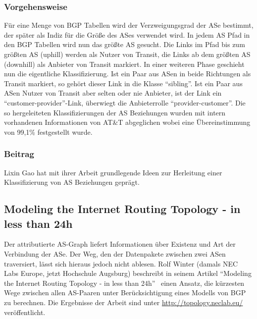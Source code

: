 \subsubsection{Vorgehensweise}
Für eine Menge von BGP Tabellen wird der Verzweigungsgrad der ASe bestimmt, der später als Indiz für die Größe des ASes verwendet wird.
In jedem AS Pfad in den BGP Tabellen wird nun das größte AS gesucht.
Die Links im Pfad bis zum größten AS (uphill) werden als Nutzer von Transit, die Links ab dem größten AS (downhill) als Anbieter von Transit markiert.
In einer weiteren Phase geschieht nun die eigentliche Klassifizierung.
Ist ein Paar aus ASen in beide Richtungen als Transit markiert, so gehört dieser Link in die Klasse "`sibling"'.
Ist ein Paar aus ASen Nutzer von Transit aber selten oder nie Anbieter, ist der Link ein "`customer-provider"'-Link, überwiegt die Anbieterrolle "`provider-customer"'.
Die so hergeleiteten Klassifizierungen der AS Beziehungen wurden mit intern vorhandenen Informationen von AT\&T abgeglichen wobei eine Übereinstimmung von 99,1\% festgestellt wurde.

\subsubsection{Beitrag}
Lixin Gao hat mit ihrer Arbeit grundlegende Ideen zur Herleitung einer Klassifizierung von AS Beziehungen geprägt.

\subsection{Modeling the Internet Routing Topology - in less than 24h}\label{subsec:winter}
Der attributierte AS-Graph liefert Informationen über Existenz und Art der Verbindung der ASe.
Der Weg, den der Datenpakete zwischen zwei ASen traversiert, lässt sich hieraus jedoch nicht ablesen.
Rolf Winter (damals NEC Labs Europe, jetzt Hochschule Augsburg) beschreibt in seinem Artikel "`Modeling the Internet Routing Topology - in less than 24h"'~\cite{conf/pads/Winter09} einen Ansatz, die kürzesten Wege zwischen allen AS-Paaren unter Berücksichtigung eines Modells von BGP zu berechnen.
Die Ergebnisse der Arbeit sind unter \url{http://topology.neclab.eu/} veröffentlicht.

